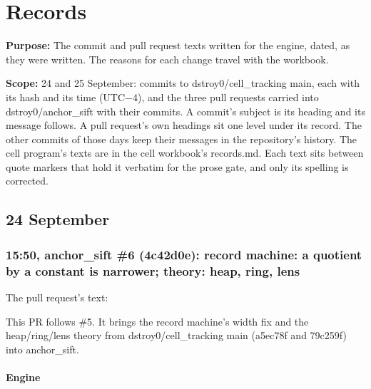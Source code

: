 \chapter{\texorpdfstring{Records}{Records}}
\label{chap:records}

\textbf{Purpose:} The commit and pull request texts written for the engine, dated, as they were written. The reasons for each change travel with the workbook.

\textbf{Scope:} 24 and 25 September: commits to dstroy0/cell\_\allowbreak{}tracking main, each with its hash and its time (UTC−4), and the three pull requests carried into dstroy0/anchor\_\allowbreak{}sift with their commits. A commit's subject is its heading and its message follows. A pull request's own headings sit one level under its record. The other commits of those days keep their messages in the repository's history. The cell program's texts are in the cell workbook's records.md. Each text sits between quote markers that hold it verbatim for the prose gate, and only its spelling is corrected.

\section{\texorpdfstring{24 September}{24 September}}

\subsection{\texorpdfstring{15:50, anchor\_\allowbreak{}sift \#6 (4c42d0e): record machine: a quotient by a constant is narrower; theory: heap, ring, lens}{15:50, anchor\_sift \#6 (4c42d0e): record machine: a quotient by a constant is narrower; theory: heap, ring, lens}}

The pull request's text:

This PR follows \#5. It brings the record machine's width fix and the heap/ring/lens theory from dstroy0/cell\_\allowbreak{}tracking main (a5ec78f and 79c259f) into anchor\_\allowbreak{}sift.

\subsubsection{\texorpdfstring{Engine}{Engine}}

